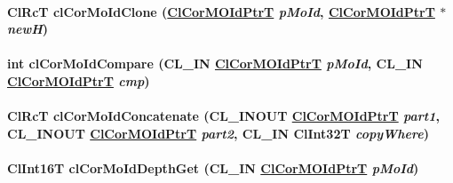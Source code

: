 \hypertarget{group__group13_ga123}{
\paragraph[clCorMoIdClone]{\setlength{\rightskip}{0pt plus 5cm}Cl\-Rc\-T cl\-Cor\-Mo\-Id\-Clone (\hyperlink{struct_cl_cor_m_o_id}{Cl\-Cor\-MOId\-Ptr\-T} {\em p\-Mo\-Id}, \hyperlink{struct_cl_cor_m_o_id}{Cl\-Cor\-MOId\-Ptr\-T} $\ast$ {\em new\-H})}\hfill}
\label{group__group13_ga123}


\hypertarget{group__group13_ga124}{
\paragraph[clCorMoIdCompare]{\setlength{\rightskip}{0pt plus 5cm}int cl\-Cor\-Mo\-Id\-Compare (CL\_\-IN \hyperlink{struct_cl_cor_m_o_id}{Cl\-Cor\-MOId\-Ptr\-T} {\em p\-Mo\-Id}, CL\_\-IN \hyperlink{struct_cl_cor_m_o_id}{Cl\-Cor\-MOId\-Ptr\-T} {\em cmp})}\hfill}
\label{group__group13_ga124}


\hypertarget{group__group13_ga129}{
\paragraph[clCorMoIdConcatenate]{\setlength{\rightskip}{0pt plus 5cm}Cl\-Rc\-T cl\-Cor\-Mo\-Id\-Concatenate (CL\_\-INOUT \hyperlink{struct_cl_cor_m_o_id}{Cl\-Cor\-MOId\-Ptr\-T} {\em part1}, CL\_\-INOUT \hyperlink{struct_cl_cor_m_o_id}{Cl\-Cor\-MOId\-Ptr\-T} {\em part2}, CL\_\-IN Cl\-Int32T {\em copy\-Where})}\hfill}
\label{group__group13_ga129}


\hypertarget{group__group13_ga113}{
\paragraph[clCorMoIdDepthGet]{\setlength{\rightskip}{0pt plus 5cm}Cl\-Int16T cl\-Cor\-Mo\-Id\-Depth\-Get (CL\_\-IN \hyperlink{struct_cl_cor_m_o_id}{Cl\-Cor\-MOId\-Ptr\-T} {\em p\-Mo\-Id})}\hfill}
\label{group__group13_ga113}


